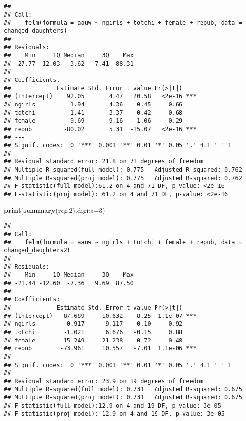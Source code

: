 \documentclass[
]{article}
\newenvironment{Shaded}{\begin{snugshade}}{\end{snugshade}}
\newcommand{\AttributeTok}[1]{\textcolor[rgb]{0.13,0.29,0.53}{#1}}
\newcommand{\DecValTok}[1]{\textcolor[rgb]{0.00,0.00,0.81}{#1}}
\newcommand{\FloatTok}[1]{\textcolor[rgb]{0.00,0.00,0.81}{#1}}
\newcommand{\FunctionTok}[1]{\textcolor[rgb]{0.13,0.29,0.53}{\textbf{#1}}}
\newcommand{\NormalTok}[1]{#1}
\begin{document}
\begin{verbatim}
## 
## Call:
##    felm(formula = aauw ~ ngirls + totchi + female + repub, data = changed_daughters) 
## 
## Residuals:
##    Min     1Q Median     3Q    Max 
## -27.77 -12.03  -3.62   7.41  88.31 
## 
## Coefficients:
##             Estimate Std. Error t value Pr(>|t|)    
## (Intercept)    92.05       4.47   20.58   <2e-16 ***
## ngirls          1.94       4.36    0.45     0.66    
## totchi         -1.41       3.37   -0.42     0.68    
## female          9.69       9.16    1.06     0.29    
## repub         -80.02       5.31  -15.07   <2e-16 ***
## ---
## Signif. codes:  0 '***' 0.001 '**' 0.01 '*' 0.05 '.' 0.1 ' ' 1
## 
## Residual standard error: 21.8 on 71 degrees of freedom
## Multiple R-squared(full model): 0.775   Adjusted R-squared: 0.762 
## Multiple R-squared(proj model): 0.775   Adjusted R-squared: 0.762 
## F-statistic(full model):61.2 on 4 and 71 DF, p-value: <2e-16 
## F-statistic(proj model): 61.2 on 4 and 71 DF, p-value: <2e-16
\end{verbatim}

\begin{Shaded}
\begin{Highlighting}[]
\FunctionTok{print}\NormalTok{(}\FunctionTok{summary}\NormalTok{(reg}\FloatTok{.2}\NormalTok{),}\AttributeTok{digits=}\DecValTok{3}\NormalTok{)}
\end{Highlighting}
\end{Shaded}

\begin{verbatim}
## 
## Call:
##    felm(formula = aauw ~ ngirls + totchi + female + repub, data = changed_daughters2) 
## 
## Residuals:
##    Min     1Q Median     3Q    Max 
## -21.44 -12.60  -7.36   9.69  87.50 
## 
## Coefficients:
##             Estimate Std. Error t value Pr(>|t|)    
## (Intercept)   87.689     10.632    8.25  1.1e-07 ***
## ngirls         0.917      9.117    0.10     0.92    
## totchi        -1.021      6.676   -0.15     0.88    
## female        15.249     21.238    0.72     0.48    
## repub        -73.961     10.557   -7.01  1.1e-06 ***
## ---
## Signif. codes:  0 '***' 0.001 '**' 0.01 '*' 0.05 '.' 0.1 ' ' 1
## 
## Residual standard error: 23.9 on 19 degrees of freedom
## Multiple R-squared(full model): 0.731   Adjusted R-squared: 0.675 
## Multiple R-squared(proj model): 0.731   Adjusted R-squared: 0.675 
## F-statistic(full model):12.9 on 4 and 19 DF, p-value: 3e-05 
## F-statistic(proj model): 12.9 on 4 and 19 DF, p-value: 3e-05
\end{verbatim}
\end{document}
